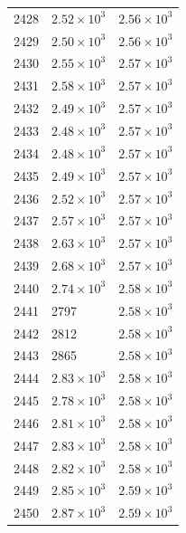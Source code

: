 \begin{table}[H]
\begin{tabular}{lll}
2428 & $\displaystyle 2.52 \times 10^{3}$ & $\displaystyle 2.56 \times 10^{3}$ \\
2429 & $\displaystyle 2.50 \times 10^{3}$ & $\displaystyle 2.56 \times 10^{3}$ \\
2430 & $\displaystyle 2.55 \times 10^{3}$ & $\displaystyle 2.57 \times 10^{3}$ \\
2431 & $\displaystyle 2.58 \times 10^{3}$ & $\displaystyle 2.57 \times 10^{3}$ \\
2432 & $\displaystyle 2.49 \times 10^{3}$ & $\displaystyle 2.57 \times 10^{3}$ \\
2433 & $\displaystyle 2.48 \times 10^{3}$ & $\displaystyle 2.57 \times 10^{3}$ \\
2434 & $\displaystyle 2.48 \times 10^{3}$ & $\displaystyle 2.57 \times 10^{3}$ \\
2435 & $\displaystyle 2.49 \times 10^{3}$ & $\displaystyle 2.57 \times 10^{3}$ \\
2436 & $\displaystyle 2.52 \times 10^{3}$ & $\displaystyle 2.57 \times 10^{3}$ \\
2437 & $\displaystyle 2.57 \times 10^{3}$ & $\displaystyle 2.57 \times 10^{3}$ \\
2438 & $\displaystyle 2.63 \times 10^{3}$ & $\displaystyle 2.57 \times 10^{3}$ \\
2439 & $\displaystyle 2.68 \times 10^{3}$ & $\displaystyle 2.57 \times 10^{3}$ \\
2440 & $\displaystyle 2.74 \times 10^{3}$ & $\displaystyle 2.58 \times 10^{3}$ \\
2441 & 2797 & $\displaystyle 2.58 \times 10^{3}$ \\
2442 & 2812 & $\displaystyle 2.58 \times 10^{3}$ \\
2443 & 2865 & $\displaystyle 2.58 \times 10^{3}$ \\
2444 & $\displaystyle 2.83 \times 10^{3}$ & $\displaystyle 2.58 \times 10^{3}$ \\
2445 & $\displaystyle 2.78 \times 10^{3}$ & $\displaystyle 2.58 \times 10^{3}$ \\
2446 & $\displaystyle 2.81 \times 10^{3}$ & $\displaystyle 2.58 \times 10^{3}$ \\
2447 & $\displaystyle 2.83 \times 10^{3}$ & $\displaystyle 2.58 \times 10^{3}$ \\
2448 & $\displaystyle 2.82 \times 10^{3}$ & $\displaystyle 2.58 \times 10^{3}$ \\
2449 & $\displaystyle 2.85 \times 10^{3}$ & $\displaystyle 2.59 \times 10^{3}$ \\
2450 & $\displaystyle 2.87 \times 10^{3}$ & $\displaystyle 2.59 \times 10^{3}$ \\

\end{tabular}
\end{table}
